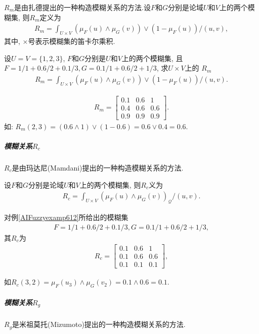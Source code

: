 $R_m$是由扎德提出的一种构造模糊关系的方法.设$F$和$G$分别是论域$U$和$V$上的两个模糊集, 则$R_m$定义为
\begin{align}
  R_{m}=\int_{U \times V}\left(\mu_{F}(u) \wedge \mu_{G}(v)\right) \vee\left(1-\mu_{F}(u)\right) /(u, v),
\end{align}
其中, $\times$号表示模糊集的笛卡尔乘积.
\begin{example}\label{AIFuzzyexamp612}
 设$U=V=\{1,2,3\}$, $F$和$G$分别是$U$和$V$上的两个模糊集, 且$F=1/1+0.6/2+0.1/3,G=0.1/1+0.6/2+1/3$, 求$U\times V$上的 $R_m$
\begin{align*}
    R_{m}=\int_{U \times V}\left(\mu_{F}(u) \wedge \mu_{G}(v)\right) \vee\left(1-\mu_{F}(u)\right) /(u, v).
\end{align*}
\vspace{-0.3cm}
\end{example}
\begin{result}
\begin{align*}
    R_{m}=\left[\begin{array}{ccc}{0.1} & {0.6} & {1} \\ {0.4} & {0.6} & {0.6} \\ {0.9} & {0.9} & {0.9}\end{array}\right].
\end{align*}
如: $R_m(2, 3) =(0.6\wedge 1)\vee (1-0.6)=0.6\vee 0.4=0.6$.
\end{result}
\subparagraph{模糊关系$R_c$}
$R_c$是由玛达尼(Mamdani)提出的一种构造模糊关系的方法.

设$F$和$G$分别是论域$U$和$V$上的两个模糊集, 则$R_c$义为
\begin{align*}
  R_{c}=\int_{U \times V}\left(\mu_{F}(u) \wedge \mu_{G}(v)\right)_{\mathcal{Q}} /(u, v).
\end{align*}
\begin{example}
对例\ref{AIFuzzyexamp612}所给出的模糊集
\begin{align*}
    F=1/1+0.6/2+0.1/3, G=0.1/1+0.6/2+1/3,
\end{align*}
其$R_c$为
\begin{align*}
    R_{c}=\left[\begin{array}{ccc}{0.1} & {0.6} & {1} \\ {0.1} & {0.6} & {0.6} \\ {0.1} & {0.1} & {0.1}\end{array}\right],
\end{align*}
\vspace{-0.2cm}
\end{example}
如$R_{c}(3,2)=\mu_{F}\left(u_{3}\right) \wedge \mu_{G}\left(v_{2}\right)=0.1 \wedge 0.6=0.1$.
\subparagraph{模糊关系$R_g$}
$R_g$是米祖莫托(Mizumoto)提出的一种构造模糊关系的方法.


